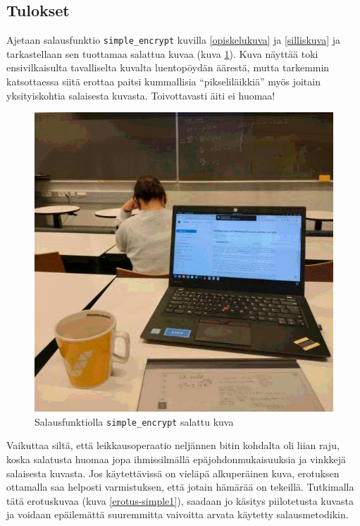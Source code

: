 \documentclass[a4paper,11pt]{article}
\begin{document}
\subsection{Tulokset}

Ajetaan salausfunktio \texttt{simple\_encrypt} kuvilla \ref{opiskelukuva} ja \ref{silliskuva} ja tarkastellaan sen tuottamaa salattua kuvaa (kuva \ref{salattu-simple}). Kuva näyttää toki ensivilkaisulta tavalliselta kuvalta luentopöydän äärestä, mutta tarkemmin katsottaessa siitä erottaa paitsi kummallisia \enquote{pikseliläikkiä} myös joitain yksityiskohtia salaisesta kuvasta. Toivottavasti äiti ei huomaa!

\begin{figure}
    \centering
    \includegraphics[width= 120mm]{kuvat/salattu1.jpg}
    \caption{Salausfunktiolla \texttt{simple\_encrypt} salattu kuva}
    \label{salattu-simple}
\end{figure}

Vaikuttaa siltä, että leikkausoperaatio neljännen bitin kohdalta oli liian raju, koska salatusta huomaa jopa ihmissilmällä epäjohdonmukaisuuksia ja vinkkejä salaisesta kuvasta. Jos käytettävissä on vieläpä alkuperäinen kuva, erotuksen ottamalla saa helposti varmistuksen, että jotain hämärää on tekeillä. Tutkimalla tätä erotuskuvaa (kuva \ref{erotus-simple1}), saadaan jo käsitys piilotetusta kuvasta ja voidaan epäilemättä suuremmitta vaivoitta arvata käytetty salausmetodikin.
\end{document}

